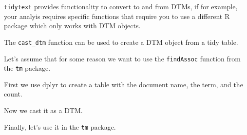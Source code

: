 \documentclass[]{book}
\newenvironment{Shaded}{\begin{snugshade}}{\end{snugshade}}
\newcommand{\CommentTok}[1]{\textcolor[rgb]{0.56,0.35,0.01}{\textit{#1}}}
\newcommand{\DataTypeTok}[1]{\textcolor[rgb]{0.13,0.29,0.53}{#1}}
\newcommand{\DecValTok}[1]{\textcolor[rgb]{0.00,0.00,0.81}{#1}}
\newcommand{\FloatTok}[1]{\textcolor[rgb]{0.00,0.00,0.81}{#1}}
\newcommand{\KeywordTok}[1]{\textcolor[rgb]{0.13,0.29,0.53}{\textbf{#1}}}
\newcommand{\NormalTok}[1]{#1}
\newcommand{\OperatorTok}[1]{\textcolor[rgb]{0.81,0.36,0.00}{\textbf{#1}}}
\newcommand{\StringTok}[1]{\textcolor[rgb]{0.31,0.60,0.02}{#1}}
\begin{document}
\texttt{tidytext} provides functionality to convert to and from DTMs, if for example, your analyis requires specific functions that require you to use a different R package which only works with DTM objects.

The \texttt{cast\_dtm} function can be used to create a DTM object from a tidy table.

Let's assume that for some reason we want to use the \texttt{findAssoc} function from the \texttt{tm} package.

First we use dplyr to create a table with the document name, the term, and the count.

\begin{Shaded}
\end{Shaded}

Now we cast it as a DTM.

\begin{Shaded}
\end{Shaded}

Finally, let's use it in the \texttt{tm} package.

\begin{Shaded}
\end{Shaded}
\end{document}
